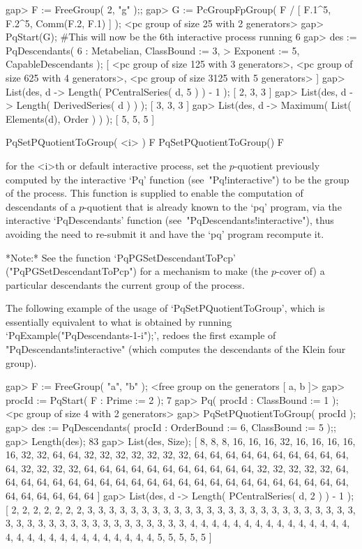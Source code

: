 \beginexample
gap> F := FreeGroup( 2, "g" );;
gap> G := PcGroupFpGroup( F / [ F.1^5, F.2^5, Comm(F.2, F.1) ] );
<pc group of size 25 with 2 generators>
gap> PqStart(G); #This will now be the 6th interactive process running
6
gap> des := PqDescendants( 6 : Metabelian, ClassBound := 3,
>                              Exponent := 5, CapableDescendants );
[ <pc group of size 125 with 3 generators>, 
  <pc group of size 625 with 4 generators>, 
  <pc group of size 3125 with 5 generators> ]
gap> List(des, d -> Length( PCentralSeries( d, 5 ) ) - 1 );
[ 2, 3, 3 ]
gap> List(des, d -> Length( DerivedSeries( d ) ) );
[ 3, 3, 3 ]
gap> List(des, d -> Maximum( List( Elements(d), Order ) ) );
[ 5, 5, 5 ]
\endexample

\>PqSetPQuotientToGroup( <i> ) F
\>PqSetPQuotientToGroup() F

for  the  <i>th  or  default  interactive  {\ANUPQ}  process,   set   the
$p$-quotient  previously  computed  by  the  interactive  `Pq'   function
(see~"Pq!interactive") to be the group of the process. This  function  is
supplied to enable the computation of descendants of a $p$-quotient  that
is already known to the `pq' program, via the interactive  `PqDescendants'
function (see~"PqDescendants!interactive"), thus  avoiding  the  need  to
re-submit it and have the `pq' program recompute it.

*Note:*       See       the       function       `PqPGSetDescendantToPcp'
("PqPGSetDescendantToPcp") for  a mechanism to make (the  $p$-cover of) a
particular descendants the current group of the process.

The following example of the usage of `PqSetPQuotientToGroup',  which  is
essentially   equivalent    to    what    is    obtained    by    running
`PqExample("PqDescendants-1-i");',   redoes   the   first   example    of
"PqDescendants!interactive" (which computes the descendants of the  Klein
four group).

\beginexample
gap> F := FreeGroup( "a", "b" );
<free group on the generators [ a, b ]>
gap> procId := PqStart( F : Prime := 2 );
7
gap> Pq( procId : ClassBound := 1 );
<pc group of size 4 with 2 generators>
gap> PqSetPQuotientToGroup( procId );
gap> des := PqDescendants( procId : OrderBound := 6, ClassBound := 5 );;
gap> Length(des);
83
gap> List(des, Size);
[ 8, 8, 8, 16, 16, 16, 32, 16, 16, 16, 16, 16, 32, 32, 64, 64, 32, 32, 32, 
  32, 32, 32, 32, 64, 64, 64, 64, 64, 64, 64, 64, 64, 64, 64, 32, 32, 32, 32, 
  64, 64, 64, 64, 64, 64, 64, 64, 64, 64, 64, 32, 32, 32, 32, 32, 64, 64, 64, 
  64, 64, 64, 64, 64, 64, 64, 64, 64, 64, 64, 64, 64, 64, 64, 64, 64, 64, 64, 
  64, 64, 64, 64, 64, 64, 64 ]
gap> List(des, d -> Length( PCentralSeries( d, 2 ) ) - 1 );
[ 2, 2, 2, 2, 2, 2, 2, 3, 3, 3, 3, 3, 3, 3, 3, 3, 3, 3, 3, 3, 3, 3, 3, 3, 3, 
  3, 3, 3, 3, 3, 3, 3, 3, 3, 3, 3, 3, 3, 3, 3, 3, 3, 3, 3, 3, 3, 3, 3, 3, 4, 
  4, 4, 4, 4, 4, 4, 4, 4, 4, 4, 4, 4, 4, 4, 4, 4, 4, 4, 4, 4, 4, 4, 4, 4, 4, 
  4, 4, 4, 5, 5, 5, 5, 5 ]
\endexample

